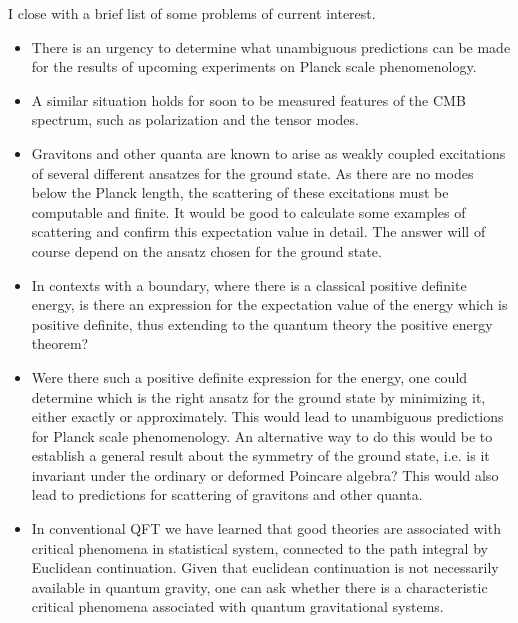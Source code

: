\documentclass[12pt]{article}
\begin{document}
I close with a brief list of some problems of 
current interest.

\begin{itemize}
    
    \item{}There is an urgency to determine what 
    unambiguous predictions can be made for the results of upcoming 
    experiments on Planck scale phenomenology. 
    
    \item{}A similar situation 
    holds for soon to be measured features of the CMB spectrum, such 
    as polarization and the tensor modes. 
    
    \item{}Gravitons and other quanta are known to arise as weakly 
    coupled excitations of several different ansatzes for the ground 
    state. As there are no modes below the Planck length, the 
    scattering of these excitations must be computable and finite. 
    It would be good to calculate some examples of scattering and 
    confirm this expectation value in detail. The answer will of 
    course depend on the ansatz chosen for the ground state.
   
    \item{}In contexts with a boundary, where there is a classical 
    positive definite energy, is there an expression for the 
    expectation value of the energy which is positive definite, thus 
    extending to the quantum theory the positive energy theorem? 
    
    \item{}Were there such a positive definite expression for the 
    energy, one could determine which is the right ansatz for the 
    ground state by minimizing it, either exactly or approximately. 
    This would lead to unambiguous predictions for Planck scale 
    phenomenology. An alternative way to do this would be to establish 
    a general result about the symmetry of the ground state, i.e. is 
    it invariant under the ordinary or deformed Poincare algebra? This 
    would also lead to predictions for scattering of gravitons and 
    other quanta. 
    
\item{}In conventional QFT we have learned that good theories
are associated with critical phenomena in statistical system, connected
to the path integral by Euclidean continuation.   Given that euclidean
continuation is not necessarily available in quantum gravity, one can ask whether there is a characteristic critical phenomena associated with quantum gravitational
systems\cite{ml-soc}.


\end{itemize}
\end{document}
